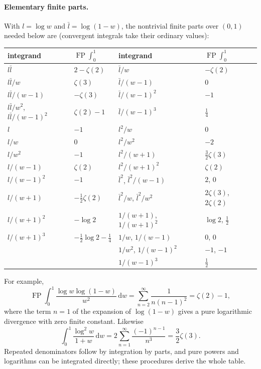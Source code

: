\documentclass[11pt,a4paper]{article}
\numberwithin{equation}{section}
\newcommand{\dd}{\,\mathrm d}
\newcommand{\FP}{\operatorname{FP}}
\begin{document}
\paragraph{Elementary finite parts.} With $l=\log w$ and $\bar l=\log(1-w)$, the nontrivial finite parts over $(0,1)$
needed below are (convergent integrals take their ordinary values):
\begin{center}\small
\renewcommand{\arraystretch}{1.25}
\begin{tabular}{@{}ll@{\qquad\qquad}ll@{}}
\toprule
integrand & $\FP\int_0^1$ & integrand & $\FP\int_0^1$\\
\midrule
$l\bar l$ & $2-\zeta(2)$ & $\bar l/w$ & $-\zeta(2)$\\
$l\bar l/w$ & $\zeta(3)$ & $\bar l/(w-1)$ & $0$\\
$l\bar l/(w-1)$ & $-\zeta(3)$ & $\bar l/(w-1)^2$ & $-1$\\
$l\bar l/w^2$, $l\bar l/(w-1)^2$ & $\zeta(2)-1$ & $\bar l/(w-1)^3$ & $\frac14$\\
$l$ & $-1$ & $l^2/w$ & $0$\\
$l/w$ & $0$ & $l^2/w^2$ & $-2$\\
$l/w^2$ & $-1$ & $l^2/(w+1)$ & $\frac32\zeta(3)$\\
$l/(w-1)$ & $\zeta(2)$ & $l^2/(w+1)^2$ & $\zeta(2)$\\
$l/(w-1)^2$ & $-1$ & $\bar l^2$, $\bar l^2/(w-1)$ & $2$, $0$\\
$l/(w+1)$ & $-\frac12\zeta(2)$ & $\bar l^2/w$, $\bar l^2/w^2$ & $2\zeta(3)$, $2\zeta(2)$\\
$l/(w+1)^2$ & $-\log2$ & $1/(w+1)$, $1/(w+1)^2$ & $\log2$, $\frac12$\\
$l/(w+1)^3$ & $-\frac12\log2-\frac14$ & $1/w$, $1/(w-1)$ & $0$, $0$\\
& & $1/w^2$, $1/(w-1)^2$ & $-1$, $-1$\\
& & $1/(w-1)^3$ & $\frac12$\\
\bottomrule
\end{tabular}
\end{center}
For example,
\begin{equation}
 \FP\!\int_0^1\frac{\log w\log(1-w)}{w^2}\dd w=\sum_{n=2}^\infty\frac1{n(n-1)^2}=\zeta(2)-1,
\end{equation}
where the term $n=1$ of the expansion of $\log(1-w)$ gives a pure logarithmic divergence with zero finite constant.
Likewise
\begin{equation}
 \int_0^1\frac{\log^2w}{1+w}\dd w=2\sum_{n=1}^\infty\frac{(-1)^{n-1}}{n^3}=\frac32\zeta(3).
\end{equation}
Repeated denominators follow by integration by parts, and pure powers and logarithms can be integrated directly; these
procedures derive the whole table.
\end{document}
